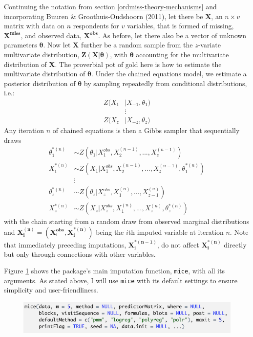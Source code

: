 \documentclass[12pt,econ]{sources/authesis}
\makeatletter
\def\maxwidth{\ifdim\Gin@nat@width>\linewidth\linewidth
\else\Gin@nat@width\fi}
\let\Oldincludegraphics\includegraphics
\renewcommand{\includegraphics}[1]{\Oldincludegraphics[width=\maxwidth]{#1}}
\def\caption{\refstepcounter\@captype \@dblarg{\@caption\@captype}}
\makeatother
\begin{document}
Continuing the notation from section \ref{ordmiss-theory-mechanisms} and incorporating Buuren \& Groothuis-Oudshoorn (2011), let there be \(\bm{X}\), an \(n \times v\) matrix with data on \(n\) respondents for \(v\) variables, that is formed of missing, \(\bm{X^{miss}}\), and observed data, \(\bm{X^{obs}}\). As before, let there also be a vector of unknown parameters \(\bm{\theta}\). Now let \(\bm{X}\) further be a random sample from the \(z\)-variate multivariate distribution, \(\bm{Z}(\bm{X} | \bm{\theta})\), with \(\bm{\theta}\) accounting for the multivariate distribution of \(\bm{X}\). The proverbial pot of gold here is how to estimate the multivariate distribution of \(\bm{\theta}\). Under the chained equations model, we estimate a posterior distribution of \(\bm{\theta}\) by sampling repeatedly from conditional distributions, i.e.:
\begin{align}
Z(X_1 &| X_{-1}, \theta_1) \nonumber\\
&\vdots \nonumber\\
Z(X_z &| X_{-z}, \theta_z)
\end{align}
Any iteration \(n\) of chained equations is then a Gibbs sampler that sequentially draws
\begin{align}
\theta_1^{*(n)} &\sim Z(\theta_1 | X_1^{obs}, X_2^{(n-1)}, ..., X_z^{(n-1)}) \nonumber\\
X_1^{*(n)} &\sim Z(X_1 | X_1^{obs}, X_2^{(n-1)}, ..., X_z^{(n-1)}, \theta_1^{*(n)}) \nonumber\\
&\vdots \nonumber\\
\theta_z^{*(n)} &\sim Z(\theta_z | X_z^{obs}, X_1^{(n)}, ..., X_{z-1}^{(n)}) \nonumber\\
X_z^{*(n)} &\sim Z(X_z | X_z^{obs}, X_1^{(n)}, ..., X_z^{(n)}, \theta_z^{*(n)})
\end{align}
with the chain starting from a random draw from observed marginal distributions and \(\bm{X_i^{(n)}} = (\bm{X_i^{obs}}, \bm{X_i^{*(n)}})\) being the \(i\)th imputed variable at iteration \(n\). Note that immediately preceding imputations, \(\bm{X_i^{*(n-1)}}\), do not affect \(\bm{X_i^{*(n)}}\) directly but only through connections with other variables.

Figure \ref{mice-func} shows the package's main imputation function, \texttt{mice}, with all its arguments. As stated above, I will use \texttt{mice} with its default settings to ensure simplicity and user-friendliness.

\vspace{0.5cm}
\begin{figure}[!htbp] 
  \centering
  \includegraphics{figures/mice.png}
  \caption{The \texttt{mice} Function}
  \label{mice-func}
\end{figure}
\vspace{-0.5cm}
\end{document}
